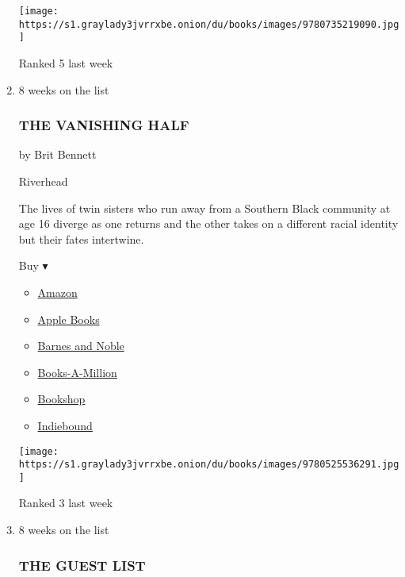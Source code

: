 \begin{enumerate}
  \texttt{[image: https://s1.graylady3jvrrxbe.onion/du/books/images/9780735219090.jpg]}

  Ranked 5 last week
\item
  8 weeks on the list

  \hypertarget{the-vanishing-half}{%
  \subsubsection{THE VANISHING HALF}\label{the-vanishing-half}}

  by Brit Bennett

  Riverhead

  The lives of twin sisters who run away from a Southern Black community
  at age 16 diverge as one returns and the other takes on a different
  racial identity but their fates intertwine.

  Buy ▾

  \begin{itemize}
  \tightlist
  \item
    \href{https://www.amazon.com/dp/0525536299?tag=NYTBSREV-20\&tag=NYTBS-20}{Amazon}
  \item
    \href{https://du-gae-books-dot-nyt-du-prd.appspot.com/buy?title=THE+VANISHING+HALF\&author=Brit+Bennett}{Apple
    Books}
  \item
    \href{https://www.anrdoezrs.net/click-7990613-11819508?url=https\%3A\%2F\%2Fwww.barnesandnoble.com\%2Fw\%2F\%3Fean\%3D9780525536291}{Barnes
    and Noble}
  \item
    \href{https://www.anrdoezrs.net/click-7990613-35140?url=https\%3A\%2F\%2Fwww.booksamillion.com\%2Fp\%2FTHE\%2BVANISHING\%2BHALF\%2FBrit\%2BBennett\%2F9780525536291}{Books-A-Million}
  \item
    \href{https://bookshop.org/a/3546/9780525536291}{Bookshop}
  \item
    \href{https://www.indiebound.org/book/9780525536291?aff=NYT}{Indiebound}
  \end{itemize}

  \texttt{[image: https://s1.graylady3jvrrxbe.onion/du/books/images/9780525536291.jpg]}

  Ranked 3 last week
\item
  8 weeks on the list

  \hypertarget{the-guest-list}{%
  \subsubsection{THE GUEST LIST}\label{the-guest-list}}


\end{enumerate}
